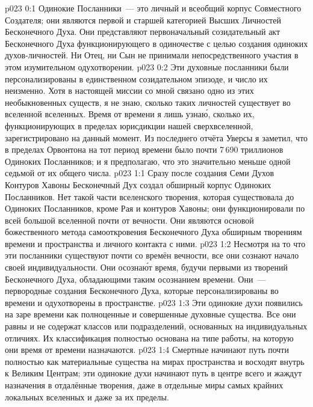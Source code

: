 \author{Божественный Советник}
\vs p023 0:1 Одинокие Посланники~--- это личный и всеобщий корпус Совместного Создателя; они являются первой и старшей категорией Высших Личностей Бесконечного Духа. Они представляют первоначальный созидательный акт Бесконечного Духа функционирующего в одиночестве с целью создания одиноких духов\hyp{}личностей. Ни Отец, ни Сын не принимали непосредственного участия в этом изумительном одухотворении.
\vs p023 0:2 Эти духовные посланники были персонализированы в единственном созидательном эпизоде, и число их неизменно. Хотя в настоящей миссии со мной связано одно из этих необыкновенных существ, я не знаю, сколько таких личностей существует во вселенной вселенных. Время от времени я лишь узна\'ю, сколько их, функционирующих в пределах юрисдикции нашей сверхвселенной, зарегистрировано на данный момент. Из последнего отчёта Уверсы я заметил, что в пределах Орвонтона на тот период времени было почти 7\,690 триллионов Одиноких Посланников; и я предполагаю, что это значительно меньше одной седьмой от их общего числа.
\vs p023 1:1 Сразу после создания Семи Духов Контуров Хавоны Бесконечный Дух создал обширный корпус Одиноких Посланников. Нет такой части вселенского творения, которая существовала до Одиноких Посланников, кроме Рая и контуров Хавоны; они функционировали по всей большой вселенной почти от вечности. Они являются основой божественного метода самооткровения Бесконечного Духа обширным творениям времени и пространства и личного контакта с ними.
\vs p023 1:2 Несмотря на то что эти посланники существуют почти со времён вечности, все они сознают начало своей индивидуальности. Они осозна\'ют время, будучи первыми из творений Бесконечного Духа, обладающими таким осознанием времени. Они~--- первородные создания Бесконечного Духа, которые персонализированы во времени и одухотворены в пространстве.
\vs p023 1:3 Эти одинокие духи появились на заре времени как полноценные и совершенные духовные существа. Все они равны и не содержат классов или подразделений, основанных на индивидуальных отличиях. Их классификация полностью основана на типе работы, на которую они время от времени назначаются.
\vs p023 1:4 Смертные начинают путь почти полностью как материальные существа на мирах пространства и восходят внутрь к Великим Центрам; эти одинокие духи начинают путь в центре всего и жаждут назначения в отдалённые творения, даже в отдельные миры самых крайних локальных вселенных и даже за их пределы.
